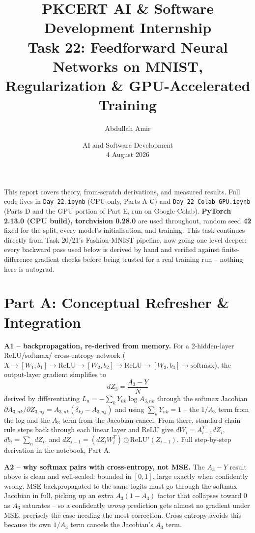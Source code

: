 \documentclass[11pt,a4paper]{article}
\title{\vspace{-1.5cm}\textbf{PKCERT AI \& Software Development Internship \\ Task 22: Feedforward Neural Networks on MNIST, Regularization \& GPU-Accelerated Training}}
\author{Abdullah Amir}
\date{AI and Software Development \\ 4 August 2026}
\begin{document}
\maketitle
\vspace{-0.8cm}

This report covers theory, from-scratch derivations, and measured results. Full code lives in
\texttt{Day\_22.ipynb} (CPU-only, Parts A-C) and \texttt{Day\_22\_Colab\_GPU.ipynb} (Parts D and
the GPU portion of Part E, run on Google Colab). \textbf{PyTorch 2.13.0 (CPU build), torchvision
0.28.0} are used throughout, random seed \textbf{42} fixed for the split, every model's
initialisation, and training. This task continues directly from Task 20/21's Fashion-MNIST
pipeline, now going one level deeper: every backward pass used below is derived by hand and
verified against finite-difference gradient checks before being trusted for a real training run
-- nothing here is autograd.

\section*{Part A: Conceptual Refresher \& Integration}

\textbf{A1 -- backpropagation, re-derived from memory.} For a 2-hidden-layer ReLU/softmax/
cross-entropy network ($X \to [W_1,b_1] \to \text{ReLU} \to [W_2,b_2] \to \text{ReLU} \to
[W_3,b_3] \to \text{softmax}$), the output-layer gradient simplifies to
$$dZ_3 = \frac{A_3 - Y}{N}$$
derived by differentiating $L_n=-\sum_k Y_{nk}\log A_{3,nk}$ through the softmax Jacobian
$\partial A_{3,nk}/\partial Z_{3,nj}=A_{3,nk}(\delta_{kj}-A_{3,nj})$ and using $\sum_k Y_{nk}=1$ --
the $1/A_3$ term from the log and the $A_3$ term from the Jacobian cancel. From there, standard
chain-rule steps back through each linear layer and ReLU give $dW_i = A_{i-1}^T dZ_i$,
$db_i=\sum_n dZ_i$, and $dZ_{i-1} = (dZ_i W_i^T)\odot\text{ReLU}'(Z_{i-1})$. Full step-by-step
derivation in the notebook, Part A.

\textbf{A2 -- why softmax pairs with cross-entropy, not MSE.} The $A_3-Y$ result above is clean
and well-scaled: bounded in $[0,1]$, large exactly when confidently wrong. MSE backpropagated to
the same logits must go through the softmax Jacobian in full, picking up an extra
$A_3(1-A_3)$ factor that collapses toward 0 as $A_3$ saturates -- so a confidently \emph{wrong}
prediction gets almost no gradient under MSE, precisely the case needing the most correction.
Cross-entropy avoids this because its own $1/A_3$ term cancels the Jacobian's $A_3$ term.
\end{document}
